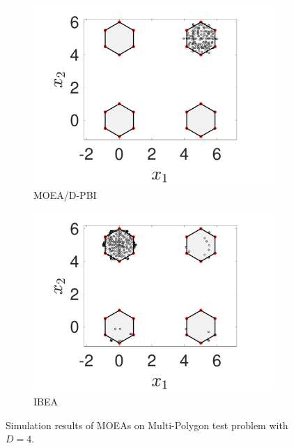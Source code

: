\documentclass[conference]{IEEEtran}
\begin{document}
\begin{figure}[htbp]
    \begin{subfigure}[b]{.22\textwidth}
    \includegraphics[width=\linewidth]{Section5/dim4/PS/MOEAD_PBI}
    \caption{MOEA/D-PBI}
    \end{subfigure}
    \begin{subfigure}[b]{.22\textwidth}
    \includegraphics[width=\linewidth]{Section5/dim4/PS/IBEA}
    \caption{IBEA}
    \end{subfigure}

    \caption{Simulation results of MOEAs on Multi-Polygon test problem with $D=4$.}
    \label{fig: MOEAs PS dim=4}
\end{figure}
\end{document}
